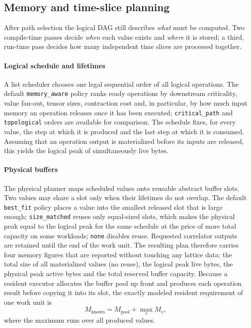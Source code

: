 \documentclass[a4paper,fleqn]{cas-dc}
\begin{document}
\subsection{Memory and time-slice planning}
\label{sec:memory_planning}

After path selection the logical DAG still describes \emph{what} must be
computed. Two compile-time passes decide \emph{when} each value exists and
\emph{where} it is stored; a third, run-time pass decides how many independent
time slices are processed together.

\paragraph{Logical schedule and lifetimes}
A list scheduler chooses one legal sequential order of all logical operations.
The default \texttt{memory\_aware} policy ranks ready operations by downstream
criticality, value fan-out, tensor sizes, contraction cost and, in particular,
by how much input memory an operation releases once it has been executed;
\texttt{critical\_path} and \texttt{topological} orders are available for
comparison. The schedule fixes, for every value, the step at which it is
produced and the last step at which it is consumed. Assuming that an operation
output is materialized before its inputs are released, this yields the logical
peak of simultaneously live bytes.

\paragraph{Physical buffers}
The physical planner maps scheduled values onto reusable abstract buffer slots.
Two values may share a slot only when their lifetimes do not overlap. The default
\texttt{best\_fit} policy places a value into the smallest released slot that
is large enough; \texttt{size\_matched} reuses only equal-sized slots, which
makes the physical peak equal to the logical peak for the same schedule at the
price of more total capacity on some workloads; \texttt{none} disables reuse.
Requested correlator outputs are retained until the end of the work unit. The
resulting plan therefore carries four memory figures that are reported
without touching any lattice data: the total size of all materialized values
(no reuse), the logical peak live bytes, the physical peak active bytes and the
total reserved buffer capacity. Because a resident executor allocates the buffer
pool up front and produces each operation result before copying it into its
slot, the exactly modeled resident requirement of one work unit is
\begin{equation}
M_{\mathrm{known}} = M_{\mathrm{pool}} + \max_v M_v ,
\label{eq:resident_memory}
\end{equation}
where the maximum runs over all produced values.
\end{document}
